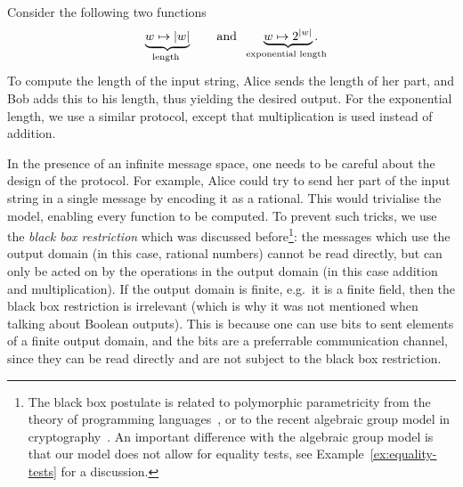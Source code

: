 \begin{myexample}\label{ex:length}
    Consider the following two functions
\begin{align*}
\myunderbrace{w \mapsto |w|}{length} \qquad \text{and} \qquad \myunderbrace{w \mapsto 2^{|w|}}{exponential length}.
\end{align*}
To compute the length of the input string, Alice  sends the length of her part, and Bob adds this to his length, thus yielding the desired output. For the exponential length, we use a similar protocol, except that multiplication is used instead of addition. 
\end{myexample}


In the presence of an infinite message space, one needs to be careful about the design of the protocol. For example, Alice could try to send her part of the input string in a single message by encoding it as a rational. This would trivialise the model, enabling every function to be computed. To prevent such tricks, we use the \emph{black box restriction} which was discussed before\footnote{The black box postulate is related to  polymorphic parametricity from the theory of programming languages~\cite[Section 7]{reynolds1983types}, or to the recent algebraic group model in cryptography~\cite[Section 1.2]{fuchsbauer2018algebraic}. An important difference with the algebraic group model is that our model does not allow for equality tests, see Example~\ref{ex:equality-tests} for a discussion.}: the messages which use the output domain (in this case, rational numbers) cannot be read directly, but can only be acted on by the operations in the output domain (in this case addition and multiplication).
 If the output domain is finite, e.g.~it is a finite field, then the black box restriction is irrelevant (which is why it was not mentioned when talking about Boolean outputs). This is because one can use bits to sent elements of a finite output domain, and the bits are a preferrable communication channel, since they can be read directly and are not subject to the black box restriction. 

